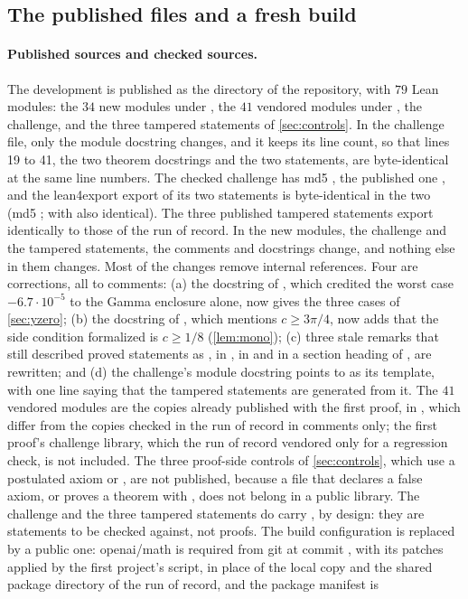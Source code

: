 \documentclass[11pt]{article}
\theoremstyle{definition}
\begin{document}
{\subsection{The published files and a fresh build}\label{sec:freshbuild}

\paragraph{Published sources and checked sources.} The development is published as the directory  of the repository, with $79$ Lean modules: the $34$ new modules under , the $41$ vendored modules under , the challenge, and the three tampered statements of \cref{sec:controls}. In the challenge file, only the module docstring changes, and it keeps its line count, so that lines 19 to 41, the two theorem docstrings and the two statements, are byte-identical at the same line numbers. The checked challenge has md5 , the published one , and the lean4export export of its two statements is byte-identical in the two (md5 ; with  also identical). The three published tampered statements export identically to those of the run of record. In the new modules, the challenge and the tampered statements, the comments and docstrings change, and nothing else in them changes. Most of the changes remove internal references. Four are corrections, all to comments: (a) the docstring of , which credited the worst case $-6.7\cdot 10^{-5}$ to the Gamma enclosure alone, now gives the three cases of \cref{sec:yzero}; (b) the docstring of , which mentions $c \ge 3\pi/4$, now adds that the side condition formalized is $c \ge 1/8$ (\cref{lem:mono}); (c) three stale remarks that still described proved statements as , in , in  and in a section heading of , are rewritten; and (d) the challenge's module docstring points to  as its template, with one line saying that the tampered statements are generated from it. The $41$ vendored  modules are the copies already published with the first proof, in , which differ from the copies checked in the run of record in comments only; the first proof's challenge library, which the run of record vendored only for a regression check, is not included. The three proof-side controls of \cref{sec:controls}, which use a postulated axiom or , are not published, because a file that declares a false axiom, or proves a theorem with , does not belong in a public library. The challenge and the three tampered statements do carry , by design: they are statements to be checked against, not proofs. The build configuration is replaced by a public one: openai/math is required from git at commit , with its patches applied by the first project's script, in place of the local copy and the shared package directory of the run of record, and the package manifest is }
\end{document}
